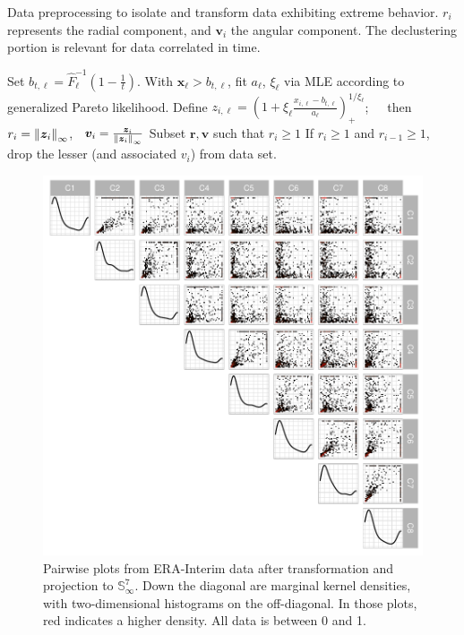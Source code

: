 \begin{algorithm}[htb]
    \caption{Data preprocessing to isolate and transform data exhibiting extreme behavior.  $r_i$
    represents the radial component, and $\bm{v}_i$ the angular component.  The declustering 
    portion is relevant for data correlated in time.\label{algo:processing}}
    \begin{algorithmic}
            \State Set $b_{t,\ell} = \hat{F}_{\ell}^{-1}\left(1 - \frac{1}{t}\right)$.
            \State With $\bm{ x}_{\ell} > b_{t,\ell}$, fit $a_{\ell}$, $\xi_{\ell}$ via MLE according to generalized Pareto likelihood.
        \EndFor
            \State Define $z_{i,\ell} = \left(1 + \xi_{\ell}\frac{x_{i,\ell} - b_{t,\ell}}{a_{\ell}}\right)_{+}^{1/\xi_{\ell}}$; $\;\;\;$ then $r_i = \pnorm{\bm{ z}_i}{\infty}$, $\;\;\bm{ v}_i = \frac{\bm{ z}_i}{\pnorm{\bm{ z}_i}{\infty}}$
        \EndFor
        \State Subset $\bm{ r},\bm{ v}$ such that $r_i \geq 1$
                \State If $r_i \geq 1$ and $r_{i-1} \geq 1$, drop the lesser (and associated $v_i$) from data set.
            \EndFor
        \EndIf
    \end{algorithmic}
\end{algorithm}


\begin{figure}[ht]%
    \centering
    \caption{Pairwise plots from ERA-Interim data after transformation and projection to ${\mathbb S}_{\infty}^{7}$.  Down the diagonal are marginal kernel densities, with two-dimensional histograms on the off-diagonal.  In those plots, red indicates a higher density.  All data is between 0 and 1.\label{fig:erai_data}}
    \includegraphics[width=.7\linewidth]{./images/data_transformed}
\end{figure}

